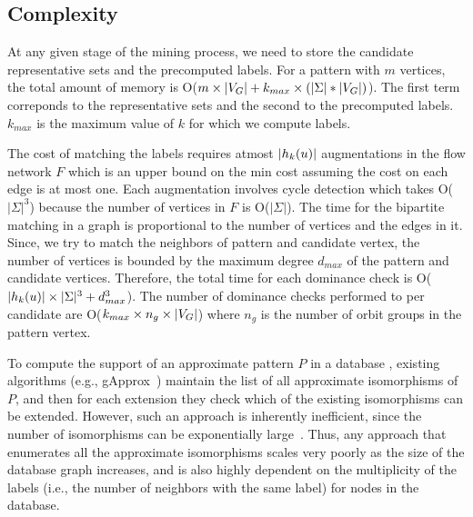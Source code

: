 \subsection{Complexity}
 At any given stage of the mining process,
we need to store the candidate representative sets and the precomputed 
\khop labels. For a pattern with $m$ vertices, the total amount of memory
is O($m \times |V_G| + k_{max} \times ( |\Sigma| * |V_G|)$). The first term
correponds to the representative sets and the second to the precomputed
\khop labels. $k_{max}$ is the maximum value of $k$ for which we compute \khop
labels.

 The cost of matching the \khop labels
requires atmost $|h_{k}(u)|$ augmentations in the flow network $F$ which is an
upper bound on the min cost assuming the cost on each edge is at most one. Each
augmentation involves cycle detection which takes O($|\Sigma|^3$) because the
number of vertices in $F$ is O($|\Sigma|$).  The time for the bipartite matching
in a graph is proportional to the number of vertices and the edges in it.
Since, we try to match the neighbors of pattern and candidate vertex,  the number
of vertices is bounded by the maximum degree $d_{max}$ of the pattern and
candidate vertices. Therefore, the total time for each dominance check is
O($|h_{k}(u)| \times |\Sigma|^3 + d_{max}^{3}$).  The number of dominance
checks performed to per candidate are O($k_{max} \times n_g \times |V_G|$) where
$n_g$ is the number of orbit groups in the pattern vertex. 

To compute the support of an approximate pattern $P$ in a database \db,
existing algorithms (e.g., gApprox~\cite{gapprox}) maintain the list of
all approximate isomorphisms of $P$, and then for each extension they
check which of the existing isomorphisms can be extended. However, such an
approach is inherently inefficient, since the number of isomorphisms can
be exponentially large~\cite{2012-kais}.  Thus, any approach that
enumerates all the approximate isomorphisms scales very poorly as the size
of the database graph increases, and is also highly dependent on the
multiplicity of the labels (i.e., the number of neighbors with the same
label) for nodes in the database.

